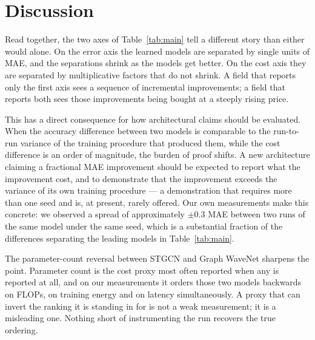 \documentclass[manuscript,screen,review]{acmart}
\begin{document}
\section{Discussion}
Read together, the two axes of Table~\ref{tab:main} tell a different story
than either would alone. On the error axis the learned models are separated by
single units of MAE, and the separations shrink as the models get better. On
the cost axis they are separated by multiplicative factors that do not shrink.
A field that reports only the first axis sees a sequence of incremental
improvements; a field that reports both sees those improvements being bought
at a steeply rising price.

This has a direct consequence for how architectural claims should be
evaluated. When the accuracy difference between two models is comparable to
the run-to-run variance of the training procedure that produced them, while
the cost difference is an order of magnitude, the burden of proof shifts. A
new architecture claiming a fractional MAE improvement should be expected to
report what the improvement cost, and to demonstrate that the improvement
exceeds the variance of its own training procedure --- a demonstration that
requires more than one seed and is, at present, rarely offered. Our own
measurements make this concrete: we observed a spread of approximately
$\pm0.3$ MAE between two runs of the same model under the same seed, which is
a substantial fraction of the differences separating the leading models in
Table~\ref{tab:main}.

The parameter-count reversal between STGCN and Graph WaveNet sharpens the
point. Parameter count is the cost proxy most often reported when any is
reported at all, and on our measurements it orders those two models backwards
on FLOPs, on training energy and on latency simultaneously. A proxy that can
invert the ranking it is standing in for is not a weak measurement; it is a
misleading one. Nothing short of instrumenting the run recovers the true
ordering.
\end{document}
